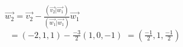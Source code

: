 \documentclass[preview]{standalone}
\begin{document}
\begin{center}
$\vec{w_2} = \vec{v_2} - \frac{(\vec{v_2} | \vec{w_1})}{(\vec{w_1} | \vec{w_1})} \vec{w_1} $ \\\  $ = (-2, 1, 1) - \frac{-3}{2} (1, 0, -1) $ $ = (\frac{-1}{2}, 1, \frac{-1}{2} ) $ \newline
\end{center}
\end{document}
